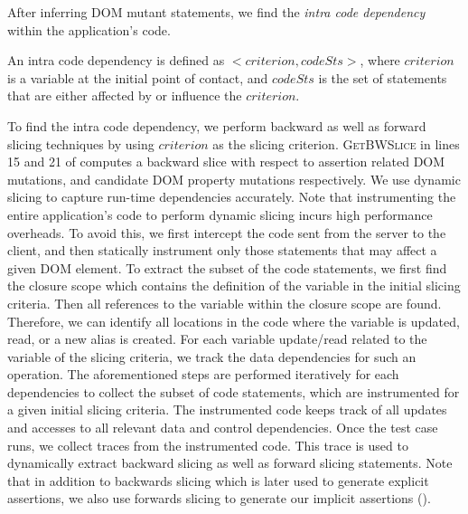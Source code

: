 After inferring DOM mutant statements, we find the \emph{intra code dependency} within the application's code.
\begin{mydef}
\label{def:intraCodeDep}  
An intra code dependency is defined as $<criterion, codeSts>$, where $criterion$ is a variable at the initial point of contact, and $codeSts$ is the set of statements that are either affected by or influence the $criterion$. 
\end{mydef}
To find the intra code dependency, we perform backward as well as forward slicing techniques by using $criterion$ as the slicing criterion.
\textsc{GetBWSlice} in lines  15 and 21 of  computes a backward slice with respect to assertion related DOM mutations, and candidate DOM property mutations respectively.
We use dynamic slicing to capture run-time dependencies accurately.
Note that instrumenting the entire application's code to perform dynamic slicing incurs high performance overheads. To avoid this, we first intercept the code sent from the server to the client, and then statically instrument only those statements that may affect a given DOM element.
To extract the subset of the code statements, we first find the \javascript closure scope which contains the definition of the variable in the initial slicing criteria. Then all references to the variable within the closure scope are found. Therefore, we can identify all locations in the code where the variable is updated, read, or a new alias is created. For each variable update/read related to the variable of the slicing criteria, we track the data dependencies for such an operation. The aforementioned steps are performed iteratively for each dependencies to collect the subset of code statements, which are instrumented for a given initial slicing criteria.
The instrumented code keeps track of all updates and accesses to all relevant data and control dependencies.   
Once the test case runs, we collect traces from the instrumented code. This trace is used to dynamically extract backward slicing as well as forward slicing statements. Note that in addition to backwards slicing which is later used to generate explicit assertions, we also use forwards slicing to generate our implicit assertions ().  

